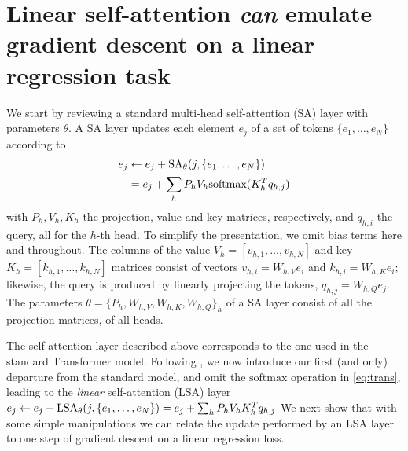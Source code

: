 \documentclass{article}
\theoremstyle{plain}
\theoremstyle{definition}
\theoremstyle{remark}
\begin{document}
\section{Linear self-attention \textit{can} 
emulate gradient descent on a linear regression task}
\label{sect:construction}

We start by reviewing a standard multi-head self-attention (SA) layer with parameters $\theta$. A SA layer updates each element $e_j$ of a set of tokens $\{e_1,\ldots,e_N\}$ according to
\begin{align}
\begin{split}
\label{eq:trans}
e_j &\leftarrow e_j + \text{SA}_{\theta}(j, \{e_1,\ldots,e_N\}) \\ &= e_j + \sum_{h} P_hV_h \text{softmax}(K_h^{T}q_{h,j})
\end{split}
\end{align}
with $P_h, V_h, K_h$ the projection, value and key matrices, respectively, and $q_{h,i}$ the query, all for the $h$-th head. To simplify the presentation, we omit bias terms here and throughout. The columns of the value
$V_h  = [v_{h,1}, \dots, v_{h,N}]$ and key $K_h=[k_{h,1}, \dots, k_{h,N}]$ matrices consist of vectors $v_{h,i} = W_{h,V}e_i$ and  $k_{h,i} = W_{h,K}e_i$; likewise, the query is produced by linearly projecting the tokens, $q_{h,j} = W_{h,Q}e_j$. The parameters  $\theta = \{P_h, W_{h,V}, W_{h,K}, W_{h,Q}\}_h$ of a SA layer consist of all the projection matrices, of all heads.

The self-attention layer described above corresponds to the one used in the standard Transformer model. Following \citet{linear_transformers_fast_weight}, we now introduce our first (and only) departure from the standard model, and omit the $\text{softmax}$ operation in \eqref{eq:trans}, leading to the \textit{linear} self-attention (LSA) layer $e_j  \leftarrow e_j + \text{LSA}_{\theta}(j, \{e_1,\ldots,e_N\}) = e_j + \sum_{h} P_hV_hK_h^{T}q_{h,j}$
We next show that with some simple manipulations we can relate the update performed by an LSA layer to one step of gradient descent on a linear regression loss.
\end{document}

